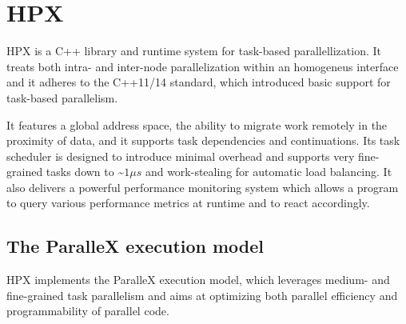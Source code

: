 
\section{HPX} \label{sec:hpx}
HPX is a C++ library and runtime system for task-based parallellization. It treats both intra- and inter-node parallelization within an homogeneus interface and it adheres to the C++11/14 standard, which introduced basic support for task-based parallelism.

It features a global address space, the ability to migrate work remotely in the proximity of data, and it supports task dependencies and continuations.
Its task scheduler is designed to introduce minimal overhead and supports very fine-grained tasks down to \textasciitilde$1\mu s$\cite{grubel2016using} and work-stealing for automatic load balancing.
It also delivers a powerful performance monitoring system which allows a program to query various performance metrics at runtime and to react accordingly.

\subsection{The ParalleX execution model}\label{subs:parallexModel}
HPX implements the ParalleX \cite{kaiser2009parallex} execution model, which leverages medium- and fine-grained task parallelism and aims at optimizing both parallel efficiency and programmability of parallel code.

